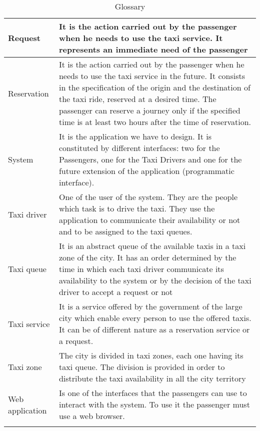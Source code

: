 \begin{center}
\begin{longtable}{| p{} | p{} |}
Request & It is the action carried out by the passenger when he needs to use the taxi service. It represents an immediate need of the passenger \\ \hline
Reservation & It is the action carried out by the passenger when he needs to use the taxi service in the future. It consists in the specification of the origin and the destination of the taxi ride, reserved at a desired time. The passenger can reserve a journey only if the specified time is at least two hours after the time of reservation. \\ \hline
System & It is the application we have to design. It is constituted by different interfaces: two for the Passengers, one for the Taxi Drivers and one for the future extension of the application (programmatic interface). \\ \hline
Taxi driver & One of the user of the system. They are the people which task is to drive the taxi. They use the application to communicate their availability or not and to be assigned to the taxi queues. \\ \hline
Taxi queue & It is an abstract queue of the available taxis in a taxi zone of the city. It has an order determined by the time in which each taxi driver communicate its availability to the system or by the decision of the taxi driver to accept a request or not \\ \hline
Taxi service & It is a service offered by the government of the large city which enable every person to use the offered taxis. It can be of different nature as a reservation service or a request. \\ \hline
Taxi zone & The city is divided in taxi zones, each one having its taxi queue. The division is provided in order to distribute the taxi availability in all the city territory \\ \hline
Web application & Is one of the interfaces that the passengers can use to interact with the system. To use it the passenger must use a web browser. \\ \hline
\caption{Glossary}
\label{glossary}
\end{longtable}
\end{center}
